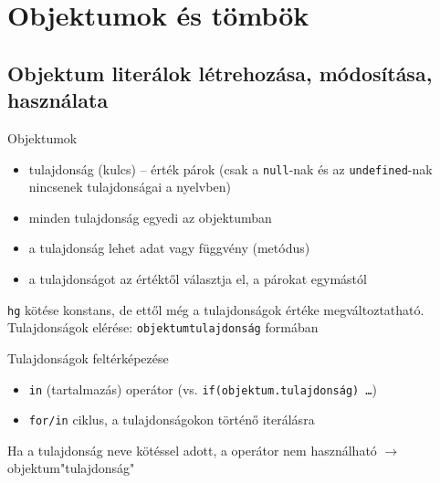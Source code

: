 \section{Objektumok és tömbök}

\subsection{Objektum literálok létrehozása, módosítása, használata}

\begin{frame}
  \small
  Objektumok
  \begin{itemize}
    \item tulajdonság (kulcs) -- érték párok (csak a \texttt{null}-nak és az \texttt{undefined}-nak nincsenek tulajdonságai a nyelvben)
    \item minden tulajdonság egyedi az objektumban
    \item a tulajdonság lehet adat vagy függvény (metódus)
    \item a tulajdonságot az értéktől \kiemel{:} választja el, a párokat egymástól \kiemel{,}
  \end{itemize}
  \begin{exampleblock}{}
    \vspace{-0.3cm}
    
    \vspace{-0.3cm}
  \end{exampleblock}
\end{frame}

\begin{frame}
  \texttt{hg} kötése konstans, de ettől még a tulajdonságok értéke megváltoztatható.\\
  Tulajdonságok elérése: \texttt{objektumtulajdonság} formában
  \footnotesize
  \begin{exampleblock}{}
    
  \end{exampleblock}
\end{frame}

\begin{frame}
  \small
  \begin{exampleblock}{}
    
  \end{exampleblock}
  \normalsize
  Tulajdonságok feltérképezése
  \begin{itemize}
    \item \texttt{in} (tartalmazás) operátor (vs. \texttt{if(objektum.tulajdonság) \dots})
    \item \texttt{for/in} ciklus, a tulajdonságokon történő iterálásra
  \end{itemize}
  Ha a tulajdonság neve kötéssel adott, a  operátor nem használható $\to$ objektum\kiemel{[}"tulajdonság"\kiemel{]}
\end{frame}

